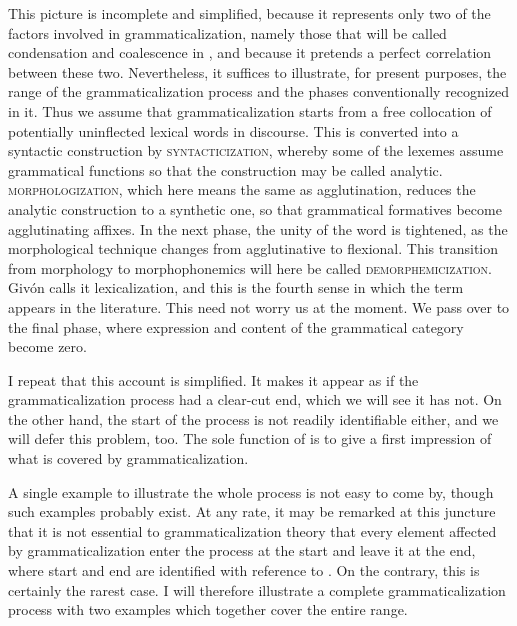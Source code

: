 \noindent This picture is incomplete and simplified, because it represents only two of the factors involved in grammaticalization, namely those that will be called condensation and coalescence in , and because it pretends a perfect correlation between these two. Nevertheless, it suffices to illustrate, for present purposes, the range of the grammaticalization process and the phases conventionally recognized in it. Thus we assume that grammaticalization starts from a free collocation of potentially uninflected lexical words in discourse. This is converted into a syntactic construction by \textsc{syntacticization}, whereby some of the lexemes assume grammatical functions so that the construction may be called analytic. \textsc{morphologization}, which here means the same as agglutination, reduces the analytic construction to a synthetic one, so that grammatical formatives become agglutinating affixes. In the next phase, the unity of the word is tightened, as the morphological technique changes from agglutinative to flexional. This transition from morphology to morphophonemics will here be called \textsc{demorphemicization}. Givón calls it lexicalization, and this is the fourth sense in which the term appears in the literature. This need not worry us at the moment. We pass over to the final phase, where expression and content of the grammatical category become zero.

I repeat that this account is simplified. It makes it appear as if the grammaticalization process had a clear-cut end, which we will see it has not. On the other hand, the start of the process is not readily identifiable either, and we will defer this problem, too. The sole function of  is to give a first impression of what is covered by grammaticalization.

A single example to illustrate the whole process is not easy to come by, though such examples probably exist. At any rate, it may be remarked at this juncture that it is not essential to grammaticalization theory that every element affected by grammaticalization enter the process at the start and leave it at the end, where start and end are identified with reference to . On the contrary, this is certainly the rarest case. I will therefore illustrate a complete grammaticalization process with two examples which together cover the entire range.

